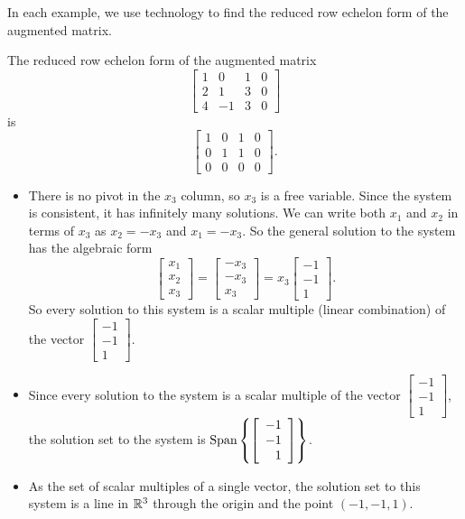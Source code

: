 \begin{example}
\ExampleSolution In each example, we use technology to find the reduced row echelon form of the augmented matrix.
\ba
\item The reduced row echelon form of the augmented matrix
\[\left[ \begin{array}{crc|c} 1&0&1&0 \\ 2&1&3&0 \\ 4&-1&3&0 \end{array} \right]\]
is
\[\left[ \begin{array}{ccc|c} 1&0&1&0 \\ 0&1&1&0 \\ 0&0&0&0 \end{array} \right].\]
	\begin{itemize}
	\item There is no pivot in the $x_3$ column, so $x_3$ is a free variable. Since the system is consistent, it has infinitely many solutions. We can write both $x_1$ and $x_2$ in terms of $x_3$ as $x_2 = -x_3$ and $x_1 = -x_3$. So the general solution to the system has the algebraic form
\[\left[ \begin{array}{c} x_1\\x_2\\x_3 \end{array} \right] = \left[ \begin{array}{r} -x_3\\-x_3\\x_3 \end{array} \right] = x_3\left[ \begin{array}{r} -1\\-1\\1 \end{array} \right].\]
So every solution to this system is a scalar multiple (linear combination) of the vector $\left[ \begin{array}{r} -1\\-1\\1 \end{array} \right]$.
	\item Since every solution to the system is a scalar multiple of the vector $\left[ \begin{array}{r} -1\\-1\\1 \end{array} \right]$, the solution set to the system is $\text{Span}\left\{\left[ \begin{array}{r} -1\\-1\\1 \end{array} \right]\right\}$. 
	\item As the set of scalar multiples of a single vector, the solution set to this system is a line in $\mathbb{R}^3$  through the origin and the point $(-1,-1,1)$. 
	\end{itemize} 
	

\end{example}
